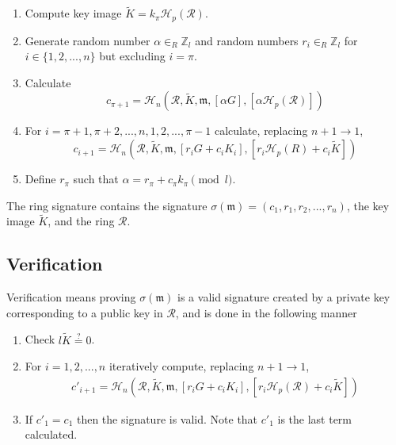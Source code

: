 \begin{enumerate}
	\item Compute key image \(\tilde{K} = k_\pi \mathcal{H}_p(\mathcal{R})\).
	
	\item Generate random number \(\alpha \in_R \mathbb{Z}_l\) and random numbers  \(r_i \in_R \mathbb{Z}_l\) for \(i \in \{1, 2, ..., n\}\) but excluding \(i = \pi\).
	
	\item Calculate
	\[c_{\pi+1} = \mathcal{H}_n(\mathcal{R}, \tilde{K}, \mathfrak{m}, [\alpha G], [\alpha \mathcal{H}_p(\mathcal{R})])\]
	
	\item For \(i = \pi+1, \pi+2, ..., n, 1, 2, ..., \pi-1\) calculate, replacing \(n + 1 \rightarrow 1\),
	\[  c_{i+1} = \mathcal{H}_n(\mathcal{R}, \tilde{K}, \mathfrak{m}, [r_i G + c_i K_i], [r_i \mathcal{H}_p(R) + c_i \tilde{K}])  \] 
	
	
	\item Define $r_\pi$ such that \(\alpha = r_\pi + c_\pi k_\pi \pmod l\).
	
\end{enumerate}

The ring signature contains the signature \(\sigma(\mathfrak{m}) = (c_1, r_1, r_2, ..., r_n) \), the key image $\tilde{K}$, and the ring $\mathcal{R}$.

\subsection*{Verification}

Verification means proving $\sigma(\mathfrak{m})$ is a valid signature created by a private key corresponding to a public key in $\mathcal{R}$, and is done in the following manner 

\begin{enumerate}
    \item Check $l \tilde{K} \stackrel{?}{=} 0$.
	\item  For \(i = 1, 2, ..., n\) iteratively compute, replacing \(n + 1 \rightarrow 1\),
	\begin{align*}
	c'_{i+1}   = \mathcal{H}_n(\mathcal{R}, \tilde{K}, \mathfrak{m}, [r_i G + c_i {K_i}], [r_i \mathcal{H}_p(\mathcal{R}) + c_i \tilde{K}])
	\end{align*}
	
	\item If \(c'_1 = c_1\) then the signature is valid. Note that $c'_1$ is the last term calculated.
\end{enumerate}

